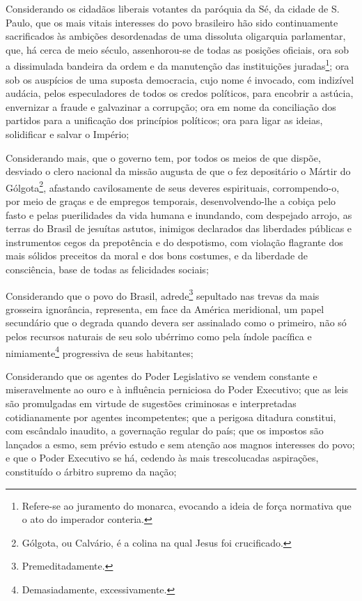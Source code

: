 Considerando os cidadãos liberais votantes da paróquia da Sé, da cidade
de S. Paulo, que os mais vitais interesses do povo brasileiro hão sido
continuamente sacrificados às ambições desordenadas de uma dissoluta
oligarquia parlamentar, que, há cerca de meio século, assenhorou-se de
todas as posições oficiais, ora sob a dissimulada bandeira da ordem e da
manutenção das instituições juradas\footnote{Refere-se ao juramento do
  monarca, evocando a ideia de força normativa que o ato do imperador
  conteria.}; ora sob os auspícios de uma suposta democracia, cujo nome
é invocado, com indizível audácia, pelos especuladores de todos os
credos políticos, para encobrir a astúcia, envernizar a fraude e
galvazinar a corrupção; ora em nome da conciliação dos partidos para a
unificação dos princípios políticos; ora para ligar as ideias,
solidificar e salvar o Império;

Considerando mais, que o governo tem, por todos os meios de que dispõe,
desviado o clero nacional da missão augusta de que o fez depositário o
Mártir do Gólgota\footnote{Gólgota, ou Calvário, é a colina na qual
  Jesus foi crucificado.}, afastando cavilosamente de seus deveres
espirituais, corrompendo-o, por meio de graças e de empregos temporais,
desenvolvendo-lhe a cobiça pelo fasto e pelas puerilidades da vida
humana e inundando, com despejado arrojo, as terras do Brasil de
jesuítas astutos, inimigos declarados das liberdades públicas e
instrumentos cegos da prepotência e do despotismo, com violação
flagrante dos mais sólidos preceitos da moral e dos bons costumes, e da
liberdade de consciência, base de todas as felicidades sociais;

Considerando que o povo do Brasil, adrede\footnote{Premeditadamente.}
sepultado nas trevas da mais grosseira ignorância, representa, em face
da América meridional, um papel secundário que o degrada quando devera
ser assinalado como o primeiro, não só pelos recursos naturais de seu
solo ubérrimo como pela índole pacífica e nimiamente\footnote{
  Demasiadamente, excessivamente.} progressiva de seus habitantes;

Considerando que os agentes do Poder Legislativo se vendem constante e
miseravelmente ao ouro e à influência perniciosa do Poder Executivo; que
as leis são promulgadas em virtude de sugestões criminosas e
interpretadas cotidianamente por agentes incompetentes; que a perigosa
ditadura constitui, com escândalo inaudito, a governação regular do
país; que os impostos são lançados a esmo, sem prévio estudo e sem
atenção aos magnos interesses do povo; e que o Poder Executivo se há,
cedendo às mais trescolucadas aspirações, constituído o árbitro supremo
da nação;

